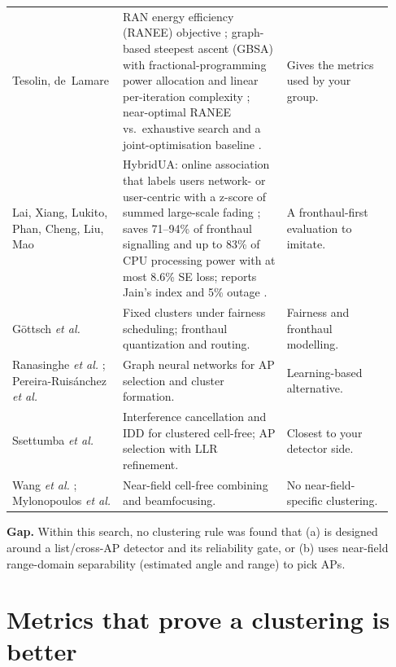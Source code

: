 \documentclass[11pt]{article}
\begin{document}
\begin{longtable}{@{}p{0.27\linewidth}p{0.40\linewidth}p{0.26\linewidth}@{}}
Tesolin, de~Lamare \cite{tesolin2026gbsa} & RAN energy efficiency (RANEE) objective \cite[eq.~(5)]{tesolin2026gbsa}; graph-based steepest ascent (GBSA) with fractional-programming power allocation and linear per-iteration complexity \cite[Abstract, Secs.~IV--V]{tesolin2026gbsa}; near-optimal RANEE vs.\ exhaustive search and a joint-optimisation baseline \cite[Sec.~VI, Fig.~3]{tesolin2026gbsa}. & Gives the metrics used by your group.\\
Lai, Xiang, Lukito, Phan, Cheng, Liu, Mao \cite{lai2024hybridua} & HybridUA: online association that labels users network- or user-centric with a z-score of summed large-scale fading \cite[Sec.~III]{lai2024hybridua}; saves 71--94\% of fronthaul signalling and up to 83\% of CPU processing power with at most 8.6\% SE loss; reports Jain's index and 5\% outage \cite[Sec.~IV]{lai2024hybridua}. & A fronthaul-first evaluation to imitate.\\
G\"ottsch \emph{et al.} \cite{gottsch2023fairness,gottsch2025fronthaul} & Fixed clusters under fairness scheduling; fronthaul quantization and routing. & Fairness and fronthaul modelling.\\
Ranasinghe \emph{et al.} \cite{ranasinghe2021gnn}; Pereira-Ruis\'anchez \emph{et al.} \cite{pereira2025gnn} & Graph neural networks for AP selection and cluster formation. & Learning-based alternative.\\
Ssettumba \emph{et al.} \cite{ssettumba2024iic,ssettumba2024idd} & Interference cancellation and IDD for clustered cell-free; AP selection with LLR refinement. & Closest to your detector side.\\
Wang \emph{et al.} \cite{wang2026combining}; Mylonopoulos \emph{et al.} \cite{mylonopoulos2025los} & Near-field cell-free combining and beamfocusing. & No near-field-specific clustering.\\
\bottomrule
\end{longtable}

\textbf{Gap.} Within this search, no clustering rule was found that (a) is designed around a list/cross-AP detector and its reliability gate, or (b) uses near-field range-domain separability (estimated angle and range) to pick APs.

\section{Metrics that prove a clustering is better}
\label{sec:metrics}
\end{document}
